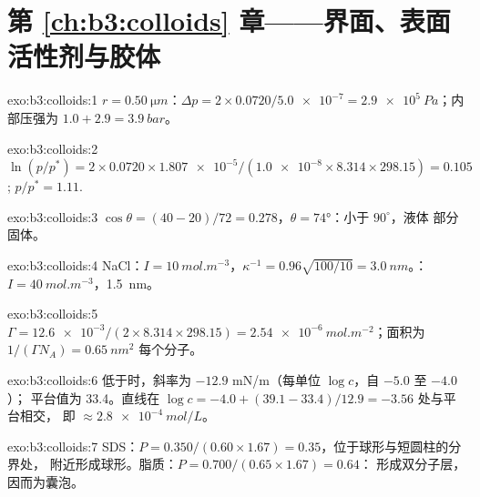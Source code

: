 \section*{第 \ref{ch:b3:colloids} 章——界面、表面活性剂与胶体}

\begin{solution}{exo:b3:colloids:1}
$r = \qty{0.50}{\micro m}$：$\Delta p = 2 \times 0.0720/\num{5.0e-7} = \qty{2.9e5}{Pa}$；内部压强为 $1.0 + 2.9 = \qty{3.9}{bar}$。
\end{solution}

\begin{solution}{exo:b3:colloids:2}
$\ln(p/p^*) = 2 \times 0.0720 \times \num{1.807e-5}/(\num{1.0e-8} \times 8.314 \times 298.15) = 0.105$; $p/p^* = 1.11$.
\end{solution}

\begin{solution}{exo:b3:colloids:3}
$\cos\theta = (40 - 20)/72 = 0.278$，$\theta = \ang{74}$：小于 $90^\circ$，液体
部分固体。
\end{solution}

\begin{solution}{exo:b3:colloids:4}
NaCl：$I = \qty{10}{mol.m^{-3}}$，$\kappa^{-1} = 0.96\sqrt{100/10} = \qty{3.0}{nm}$。：$I = \qty{40}{mol.m^{-3}}$，\qty{1.5}{nm}。
\end{solution}

\begin{solution}{exo:b3:colloids:5}
$\Gamma = \num{12.6e-3}/(2 \times 8.314 \times 298.15) = \qty{2.54e-6}{mol.m^{-2}}$；面积为 $1/(\Gamma N_A) =
\qty{0.65}{nm^2}$ 每个分子。
\end{solution}

\begin{solution}{exo:b3:colloids:6}
低于时，斜率为 $-12.9$ \unit{mN/m}（每单位 $\log c$，自 $-5.0$ 至 $-4.0$）；
平台值为 33.4。直线在 $\log c = -4.0 + (39.1 - 33.4)/12.9 = -3.56$ 处与平台相交，
即 $\approx \qty{2.8e-4}{mol/L}$。
\end{solution}

\begin{solution}{exo:b3:colloids:7}
SDS：$P = 0.350/(0.60 \times 1.67) = 0.35$，位于球形与短圆柱的分界处，
附近形成球形。脂质：$P = 0.700/(0.65 \times 1.67) = 0.64$：
形成双分子层，因而为囊泡。
\end{solution}


